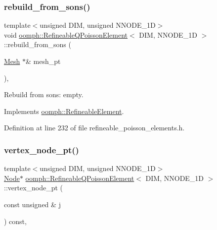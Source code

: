\subsubsection{\texorpdfstring{rebuild\+\_\+from\+\_\+sons()}{rebuild\_from\_sons()}}
{\footnotesize\ttfamily template$<$unsigned D\+IM, unsigned N\+N\+O\+D\+E\+\_\+1D$>$ \\
void \hyperlink{classoomph_1_1RefineableQPoissonElement}{oomph\+::\+Refineable\+Q\+Poisson\+Element}$<$ D\+IM, N\+N\+O\+D\+E\+\_\+1D $>$\+::rebuild\+\_\+from\+\_\+sons (\begin{DoxyParamCaption}\item[{\hyperlink{classoomph_1_1Mesh}{Mesh} $\ast$\&}]{mesh\+\_\+pt }\end{DoxyParamCaption})\hspace{0.3cm}{\ttfamily [inline]}, {\ttfamily [virtual]}}



Rebuild from sons\+: empty. 



Implements \hyperlink{classoomph_1_1RefineableElement_a33324be27833fa4b78279d17158215fa}{oomph\+::\+Refineable\+Element}.



Definition at line 232 of file refineable\+\_\+poisson\+\_\+elements.\+h.

\mbox{\label{classoomph_1_1RefineableQPoissonElement_a59c7b6a6abd015316b87672dae4ec85f}} 
\subsubsection{\texorpdfstring{vertex\+\_\+node\+\_\+pt()}{vertex\_node\_pt()}}
{\footnotesize\ttfamily template$<$unsigned D\+IM, unsigned N\+N\+O\+D\+E\+\_\+1D$>$ \\
\hyperlink{classoomph_1_1Node}{Node}$\ast$ \hyperlink{classoomph_1_1RefineableQPoissonElement}{oomph\+::\+Refineable\+Q\+Poisson\+Element}$<$ D\+IM, N\+N\+O\+D\+E\+\_\+1D $>$\+::vertex\+\_\+node\+\_\+pt (\begin{DoxyParamCaption}\item[{const unsigned \&}]{j }\end{DoxyParamCaption}) const\hspace{0.3cm}{\ttfamily [inline]}, {\ttfamily [virtual]}}



